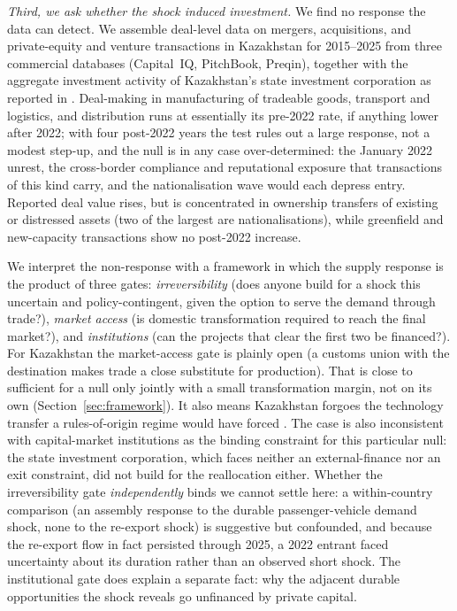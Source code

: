 \documentclass[12pt]{article}
\begin{document}
\emph{Third, we ask whether the shock induced investment.} We find no response the data can
detect. We assemble deal-level data on mergers, acquisitions, and private-equity and venture
transactions in Kazakhstan for 2015--2025 from three commercial databases (Capital~IQ,
PitchBook, Preqin), together with the aggregate investment activity of Kazakhstan's state
investment corporation as reported in \citet{qicaifcifc2026pe}. Deal-making in manufacturing of tradeable goods,
transport and logistics, and distribution runs at essentially its pre-2022 rate, if anything
lower after 2022; with four post-2022 years the test rules out a large response, not a modest
step-up, and the null is in any case over-determined: the January 2022 unrest, the
cross-border compliance and reputational exposure that transactions of this kind carry, and
the nationalisation wave would each depress entry. Reported deal value
rises, but is concentrated in ownership transfers of existing or
distressed assets (two of the largest are nationalisations), while greenfield and
new-capacity transactions show no post-2022 increase.

We interpret the non-response with a framework in which the supply response is the product of
three gates: \emph{irreversibility} (does anyone build for a shock this uncertain and
policy-contingent, given the option to serve the demand through trade?), \emph{market access}
(is domestic transformation required to reach the final market?), and \emph{institutions} (can
the projects that clear the first two be financed?). For Kazakhstan the market-access gate is
plainly open (a customs union with the destination makes trade a close substitute for
production). That is close to sufficient for a null only jointly with a small transformation
margin, not on its own (Section~\ref{sec:framework}). It also means Kazakhstan forgoes
the technology transfer a rules-of-origin regime would have forced \citep{desouza2024diffusion}. The case
is also inconsistent with capital-market institutions as the binding constraint for this particular null:
the state investment corporation, which faces neither an external-finance nor an exit
constraint, did not build for the reallocation either. Whether the irreversibility gate
\emph{independently} binds we cannot settle here: a within-country comparison (an assembly
response to the durable passenger-vehicle demand shock, none to the re-export shock) is
suggestive but confounded, and because the re-export flow in fact persisted through 2025, a
2022 entrant faced uncertainty about its duration rather than an observed short shock. The
institutional gate does explain a separate fact: why the adjacent durable opportunities the
shock reveals go unfinanced by private capital.
\end{document}
